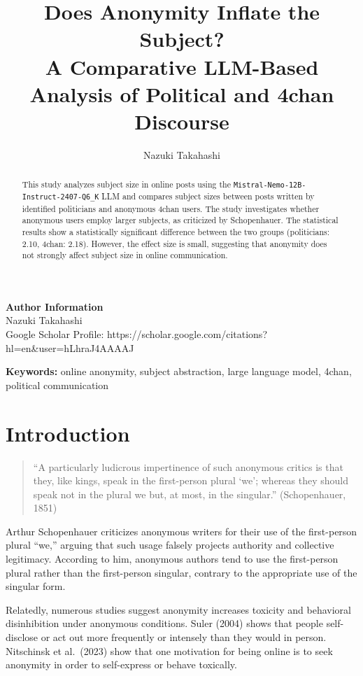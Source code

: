 \documentclass{article}
\title{Does Anonymity Inflate the Subject?\\
A Comparative LLM-Based Analysis of Political and 4chan Discourse}
\author{Nazuki Takahashi}
\date{}
\begin{document}
\maketitle

\noindent
\textbf{Author Information} \\
Nazuki Takahashi \\
Google Scholar Profile: https://scholar.google.com/citations?hl=en&user=hLhraJ4AAAAJ

\begin{abstract}
This study analyzes subject size in online posts using the 
\texttt{Mistral-Nemo-12B-Instruct-2407-Q6\_K} LLM and compares subject sizes 
between posts written by identified politicians and anonymous 4chan users. 
The study investigates whether anonymous users employ larger subjects, as 
criticized by Schopenhauer. The statistical results show a statistically 
significant difference between the two groups (politicians: 2.10, 4chan: 2.18). 
However, the effect size is small, suggesting that anonymity does not strongly 
affect subject size in online communication.
\end{abstract}

\noindent
\textbf{Keywords:} online anonymity, subject abstraction, large language model, 4chan, political communication

\section{Introduction}

\begin{quote}
``A particularly ludicrous impertinence of such anonymous critics is that they,
like kings, speak in the first-person plural `we'; whereas they should speak
not in the plural we but, at most, in the singular.'' (Schopenhauer, 1851)
\end{quote}

Arthur Schopenhauer criticizes anonymous writers for their use of the 
first-person plural ``we,'' arguing that such usage falsely projects authority 
and collective legitimacy. According to him, anonymous authors tend to use the 
first-person plural rather than the first-person singular, contrary to the 
appropriate use of the singular form.

Relatedly, numerous studies suggest anonymity increases toxicity and behavioral 
disinhibition under anonymous conditions. Suler (2004) shows that people 
self-disclose or act out more frequently or intensely than they would in person. 
Nitschinsk et al.\ (2023) show that one motivation for being online is to seek 
anonymity in order to self-express or behave toxically.
\end{document}
